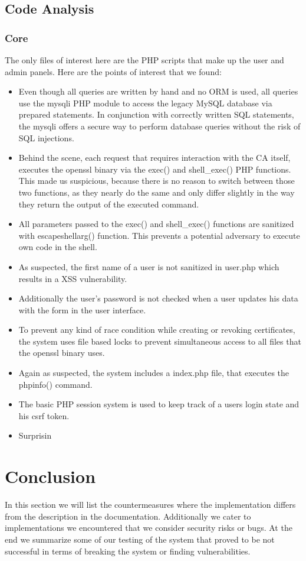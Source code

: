 \documentclass{article}
\begin{document}
\subsection{Code Analysis}
\subsubsection{Core}
The only files of interest here are the PHP scripts that make up the user and admin panels. Here are the points of interest that we found:
\begin{itemize}
\item Even though all queries are written by hand and no ORM is used, all queries use the mysqli PHP module to access the legacy MySQL database via prepared statements. In conjunction with correctly written SQL statements, the mysqli offers a secure way to perform database queries without the risk of SQL injections.
\item Behind the scene, each request that requires interaction with the CA itself, executes the openssl binary via the exec() and shell\_exec() PHP functions. This made us suspicious, because there is no reason to switch between those two functions, as they nearly do the same and only differ slightly in the way they return the output of the executed command.
\item All parameters passed to the exec() and shell\_exec() functions are sanitized with escapeshellarg() function. This prevents a potential adversary to execute own code in the shell.
\item As suspected, the first name of a user is not sanitized in user.php which results in a XSS vulnerability.
\item Additionally the user's password is not checked when a user updates his data with the form in the user interface.
\item To prevent any kind of race condition while creating or revoking certificates, the system uses file based locks to prevent simultaneous access to all files that the openssl binary uses.
\item Again as suspected, the system includes a index.php file, that executes the phpinfo() command.
\item The basic PHP session system is used to keep track of a users login state and his csrf token.
\item Surprisin
\end{itemize}

\section{Conclusion}
In this section we will list the countermeasures where the implementation differs from the description in the documentation. Additionally we cater to implementations we encountered that we consider security risks or bugs. At the end we summarize some of our testing of the system that proved to be not successful in terms of breaking the system or finding vulnerabilities.
\end{document}

